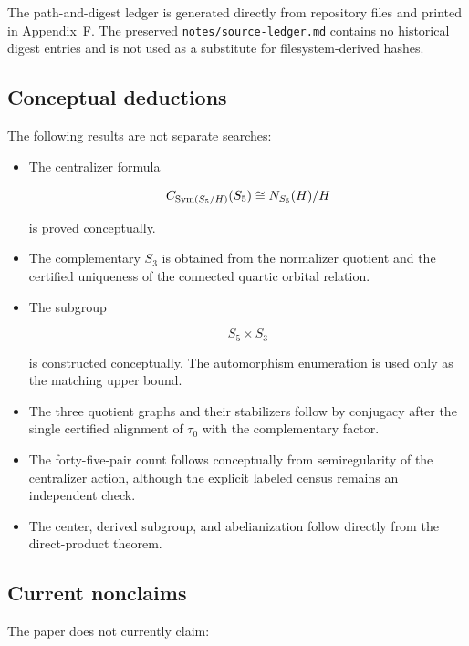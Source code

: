 The path-and-digest ledger is generated directly from repository files
and printed in Appendix~F. The preserved
\texttt{notes/source-ledger.md} contains no historical digest entries and
is not used as a substitute for filesystem-derived hashes.

\subsection{Conceptual deductions}

The following results are not separate searches:

\begin{itemize}

\item
The centralizer formula

\[
C_{\operatorname{Sym}(S_5/H)}(S_5)\cong N_{S_5}(H)/H
\]

is proved conceptually.

\item
The complementary \(S_3\) is obtained from the normalizer quotient and the
certified uniqueness of the connected quartic orbital relation.

\item
The subgroup

\[
S_5\times S_3
\]

is constructed conceptually. The automorphism enumeration is used only
as the matching upper bound.

\item
The three quotient graphs and their stabilizers follow by conjugacy after
the single certified alignment of \(\tau_0\) with the complementary
factor.

\item
The forty-five-pair count follows conceptually from semiregularity of the
centralizer action, although the explicit labeled census remains an
independent check.

\item
The center, derived subgroup, and abelianization follow directly from the
direct-product theorem.

\end{itemize}

\subsection{Current nonclaims}

The paper does not currently claim:

